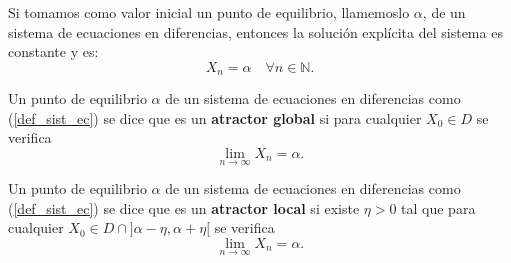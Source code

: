 \begin{proposition}
Si tomamos como valor inicial un punto de equilibrio, llamemoslo $\alpha$, de un sistema de ecuaciones en diferencias, entonces la solución explícita del sistema es constante y es:
$$X_n = \alpha \quad \forall n\in\mathbb{N}.$$
\end{proposition}

\begin{definition}
Un punto de equilibrio $\alpha$ de un sistema de ecuaciones en diferencias como (\ref{def_sist_ec}) se dice que es un \textbf{atractor global} si para cualquier $X_0\in D$ se verifica
$$\displaystyle\lim_{n\to \infty} X_n = \alpha.$$
\end{definition}

\begin{definition}
Un punto de equilibrio $\alpha$ de un sistema de ecuaciones en diferencias como (\ref{def_sist_ec}) se dice que es un \textbf{atractor local} si existe $\eta>0$ tal que para cualquier $X_0\in D\cap \text{]}\alpha -\eta , \alpha + \eta \text{[}$ se verifica
$$\displaystyle\lim_{n\to \infty} X_n = \alpha.$$

\end{definition}